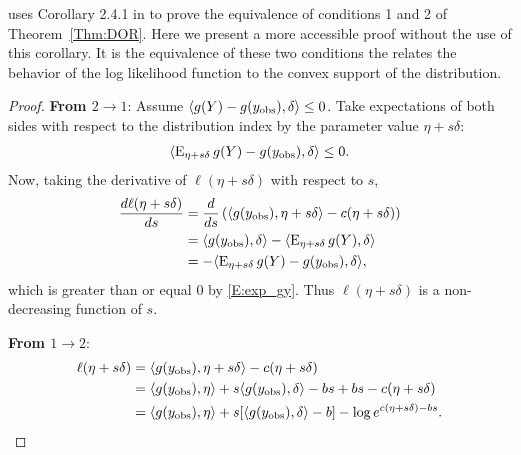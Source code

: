 \citeauthor{Geyer:gdor} uses Corollary 2.4.1 in \citep{Geyer:1990} to prove the 
equivalence of conditions 1 and 2 of Theorem~\ref{Thm:DOR}.  Here we present
a more accessible proof without the use of this corollary.  It is the equivalence
of these two conditions the relates the behavior of the log likelihood function
to the convex support of the distribution.
\begin{proof}
\textbf{From $2 \to 1$}:
Assume $\langle g(Y)-g(y_{\textrm{obs}}), \delta \rangle \leq 0$.  Take expectations of both sides
with respect to the distribution index by the parameter value $\eta + s \delta$:
\begin{align} \label{E:exp_gy}
\langle  \operatorname{E}_{\eta + s \delta} g(Y) - g(y_{\textrm{obs}}), \delta \rangle \leq 0.
\end{align}
Now, taking the derivative of $\ell( \eta + s\delta)$ with respect to $s$,
\begin{align*}
\frac{d \ell( \eta + s \delta)}{d s} &= \frac{d }{d s} 
			\left ( \langle g(y_{\textrm{obs}}), \eta+s \delta \rangle - c(\eta+s\delta)  \right )\\
	&= \langle g(y_{\textrm{obs}}), \delta \rangle - \langle  \operatorname{E}_{\eta+s\delta}g(Y),\delta  \rangle\\
	&= - \langle  \operatorname{E}_{\eta+s\delta}g(Y) - g(y_{\textrm{obs}}),\delta  \rangle,
\end{align*}
which is greater than or equal 0 by \eqref{E:exp_gy}.
Thus $\ell(\eta+s\delta)$ is a non-decreasing function of $s$.

\textbf{From $1 \to 2$}:
\begin{align}
	\ell( \eta+s\delta) &= \langle g(y_{\textrm{obs}}), \eta+s\delta \rangle - c(\eta+s\delta) \notag \\ 
	&= \langle g(y_{\textrm{obs}}), \eta \rangle + s \langle g(y_{\textrm{obs}}),\delta \rangle -bs +bs - c(\eta+s\delta) \notag \\ 
	&= \langle g(y_{\textrm{obs}}), \eta \rangle + s [\langle g(y_{\textrm{obs}}),\delta \rangle -b]  - \log e^{c(\eta+s\delta) -bs}. \label{E:expanded ell}
\end{align}


\end{proof}
